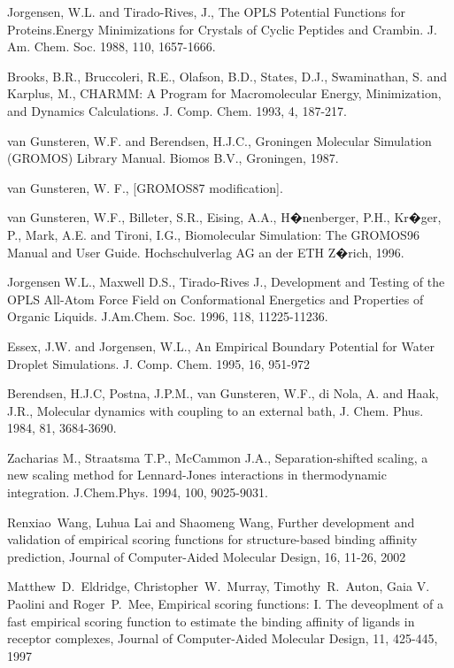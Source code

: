 \documentclass[a4paper,10pt]{article}
\begin{document}
\begin{thebibliography}{2}
 Jorgensen, W.L. and Tirado-Rives, J., The OPLS Potential Functions for Proteins.Energy Minimizations for Crystals of Cyclic Peptides and Crambin. J. Am. Chem. Soc. 1988, 110,
1657-1666.

 Brooks, B.R., Bruccoleri, R.E., Olafson, B.D., States, D.J., Swaminathan, S. and Karplus, M., CHARMM: A Program for Macromolecular Energy, Minimization, and Dynamics Calculations. J. Comp. Chem. 1993, 4,
187-217.

 van Gunsteren, W.F. and Berendsen, H.J.C., Groningen Molecular Simulation (GROMOS) Library Manual. Biomos B.V., Groningen,
1987.

 van Gunsteren, W. F., [GROMOS87
modification].

 van Gunsteren, W.F., Billeter, S.R., Eising, A.A., H�nenberger, P.H., Kr�ger, P., Mark, A.E. and Tironi, I.G., Biomolecular Simulation: The GROMOS96 Manual and User Guide. Hochschulverlag AG an der ETH Z�rich,
1996.

 Jorgensen W.L., Maxwell D.S., Tirado-Rives J., Development and Testing of the OPLS All-Atom Force Field on
Conformational Energetics and Properties of Organic Liquids.
J.Am.Chem. Soc. 1996, 118, 11225-11236.

Essex, J.W. and Jorgensen, W.L., An Empirical Boundary Potential for Water Droplet Simulations. J. Comp. Chem. 1995, 16, 951-972

Berendsen, H.J.C, Postna, J.P.M., van
Gunsteren, W.F., di Nola, A. and Haak, J.R., Molecular dynamics
with coupling to an external bath, J. Chem. Phus. 1984, 81,
3684-3690.

 Zacharias M., Straatsma T.P., McCammon J.A., Separation-shifted scaling, a new scaling method for Lennard-Jones
interactions in thermodynamic integration. J.Chem.Phys. 1994, 100,
9025-9031.

Renxiao~Wang, Luhua Lai and Shaomeng Wang,
Further development and validation of empirical scoring functions for structure-based binding affinity prediction,
Journal of Computer-Aided Molecular Design, 16, 11-26, 2002

Matthew~D.~Eldridge, Christopher~W.~Murray, Timothy~R.~Auton, Gaia V. Paolini and Roger~P.~Mee,
Empirical scoring functions: I. The deveoplment of a fast empirical scoring function to estimate the binding affinity of ligands in receptor complexes, Journal of Computer-Aided Molecular Design, 11, 425-445, 1997


\end{thebibliography}
\end{document}
